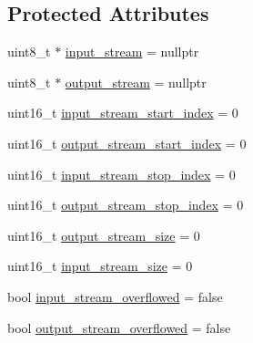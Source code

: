 \subsection*{Protected Attributes}
\begin{DoxyCompactItemize}
\item 
uint8\-\_\-t $\ast$ \hyperlink{class_stream_aaa6b266a85844345faee432d0267c6ec}{input\-\_\-stream} = nullptr
\item 
uint8\-\_\-t $\ast$ \hyperlink{class_stream_ab2d136f405b24e5eb2a6058b24fabfa3}{output\-\_\-stream} = nullptr
\item 
uint16\-\_\-t \hyperlink{class_stream_ade2d5afb993214626e7c7d66cb76cd46}{input\-\_\-stream\-\_\-start\-\_\-index} = 0
\item 
uint16\-\_\-t \hyperlink{class_stream_a7406f5db92c18f0a6d7dcc924a6122cc}{output\-\_\-stream\-\_\-start\-\_\-index} = 0
\item 
uint16\-\_\-t \hyperlink{class_stream_a52cf2f675dd7ec342615e82cc29513de}{input\-\_\-stream\-\_\-stop\-\_\-index} = 0
\item 
uint16\-\_\-t \hyperlink{class_stream_ac3b2282b5977151124aa77c2d4e411ec}{output\-\_\-stream\-\_\-stop\-\_\-index} = 0
\item 
uint16\-\_\-t \hyperlink{class_stream_a3a171d646ab70eeb9c034aecb3a72003}{output\-\_\-stream\-\_\-size} = 0
\item 
uint16\-\_\-t \hyperlink{class_stream_a8a754b0acc9552d1b78de92b2476f4cb}{input\-\_\-stream\-\_\-size} = 0
\item 
bool \hyperlink{class_stream_aeffd88d8ca71bf0d084ded2a251e3a57}{input\-\_\-stream\-\_\-overflowed} = false
\item 
bool \hyperlink{class_stream_a91eb40b21c46bd57b61811a890ac047a}{output\-\_\-stream\-\_\-overflowed} = false
\end{DoxyCompactItemize}


